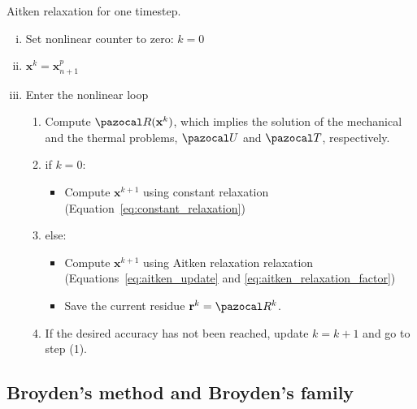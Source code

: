 \begin{framedbox}[htb]
  \caption{Aitken relaxation for one timestep.}
  \label{box:aitken_relaxation}
  \begin{center}
    \begin{minipage}{0.9\textwidth}
    \begin{enumerate}[(i)]
    \item Set nonlinear counter to zero: \(k=0\)
    \item \(\mathbf x^k = \mathbf x_{n+1}^p\)
    \item Enter the nonlinear loop
    \begin{enumerate}[(1)]
      \item Compute \(\pazocal R(\mathbf x^k)\), which implies the solution of the mechanical and the thermal problems, \(\pazocal U\) and \(\pazocal T\), respectively.
      \item if \(k=0\):
      \begin{itemize}
        \item Compute \(\mathbf x^{k+1}\) using constant relaxation (Equation~\eqref{eq:constant_relaxation})
      \end{itemize}
      \item else:
      \begin{itemize}
        \item Compute \(\mathbf x^{k+1}\) using Aitken relaxation relaxation (Equations~\eqref{eq:aitken_update} and \eqref{eq:aitken_relaxation_factor})
        \item Save the current residue \(\mathbf r^k = \pazocal R^k\).
      \end{itemize}
      \item If the desired accuracy has not been reached, update \(k=k+1\) and go to step (1).
    \end{enumerate}
    \end{enumerate}
    \end{minipage}
  \end{center}
\end{framedbox}

\subsection{Broyden's method and Broyden's family}

